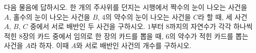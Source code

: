 다음 물음에 답하시오.
 한 개의 주사위를 던지는 시행에서 짝수의 눈이 나오는 사건을 $A$, 홀수의 눈이 나오는 사건을 $B$, $4$의 약수의 눈이 나오는 사건을 $C$라 할 때, 세 사건 $A$, $B$, $C$ 중에서 서로 배반인 두 사건을 구하시오.
 $1$부터 $8$까지의 자연수가 각각 하나씩 적힌 $8$장의 카드 중에서 임의로 한 장의 카드를 뽑을 때, $6$의 약수가 적힌 카드를 뽑는 사건을 $A$라 하자. 이때 $A$와 서로 배반인 사건의 개수를 구하시오.
